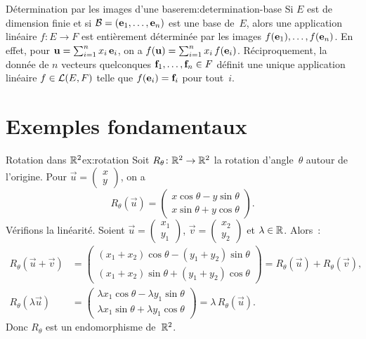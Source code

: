 \begin{remark}{Détermination par les images d'une base}{rem:determination-base}
  Si $E$ est de dimension finie et si ${\mathcal{B}}=(\mathbf{e}_{1},\ldots,\mathbf{e}_{n})$
  est une base de~$E$, alors une application linéaire $f\colon E\to F$
  est entièrement déterminée par les images $f(\mathbf{e}_{1}),\ldots,f(\mathbf{e}_{n})$.
  En effet, pour $\mathbf{u}=\sum_{i=1}^{n}x_i\,\mathbf{e}_{i}$, on a
  $f(\mathbf{u})=\sum_{i=1}^{n}x_i\,f(\mathbf{e}_{i})$. Réciproquement, la
  donnée de $n$ vecteurs quelconques $\mathbf{f}_{1},\ldots,\mathbf{f}_{n}\in F$
  définit une unique application linéaire $f\in{\mathcal{L}}(E,F)$ telle que
  $f(\mathbf{e}_{i})=\mathbf{f}_{i}$ pour tout~$i$.
\end{remark}

\section{Exemples fondamentaux}\label{sec:exemples-al}

\begin{example}{Rotation dans ${\mathbb{R}}^2$}{ex:rotation}
  Soit $R_\theta\colon{\mathbb{R}}^2\to{\mathbb{R}}^2$ la rotation d'angle~$\theta$ autour de
  l'origine. Pour $\vec{u}=\begin{pmatrix}x\\y\end{pmatrix}$, on a
  \[
    R_\theta(\vec{u})=\begin{pmatrix}
      x\cos\theta-y\sin\theta \\ x\sin\theta+y\cos\theta
    \end{pmatrix}.
  \]
  Vérifions la linéarité. Soient $\vec{u}=\begin{pmatrix}x_1\\y_1\end{pmatrix}$,
  $\vec{v}=\begin{pmatrix}x_2\\y_2\end{pmatrix}$ et $\lambda\in{\mathbb{R}}$. Alors~:
  \begin{align*}
    R_\theta(\vec{u}+\vec{v})
    &=\begin{pmatrix}(x_1+x_2)\cos\theta-(y_1+y_2)\sin\theta\\
      (x_1+x_2)\sin\theta+(y_1+y_2)\cos\theta\end{pmatrix}
    =R_\theta(\vec{u})+R_\theta(\vec{v}),\\
    R_\theta(\lambda\vec{u})
    &=\begin{pmatrix}\lambda x_1\cos\theta-\lambda y_1\sin\theta\\
      \lambda x_1\sin\theta+\lambda y_1\cos\theta\end{pmatrix}
    =\lambda\, R_\theta(\vec{u}).
  \end{align*}
  Donc $R_\theta$ est un endomorphisme de~${\mathbb{R}}^2$.
\end{example}

